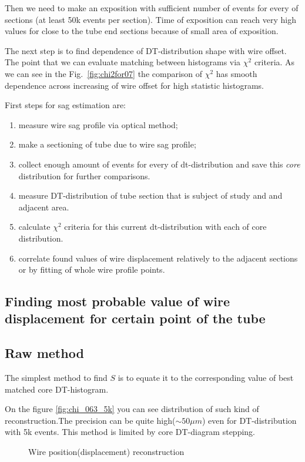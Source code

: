 	Then we need to make an exposition with sufficient number of events for every of sections (at least 50k events per section). Time of exposition can reach very high values for close to the tube end sections because of small area of exposition.
	
	The next step is to find dependence of DT-distribution shape with wire offset. The point that we can evaluate matching between histograms via $\chi^2$  criteria. As we can see in the Fig.~\ref{fig:chi2for07} the comparison of  $\chi^2$ has smooth dependence across increasing of wire offset for high statistic histograms.
		
	First steps for sag estimation are:
	\begin{enumerate}
	\item measure wire sag profile via optical method;	
	\item make a sectioning of tube due to wire sag profile;
	\item collect enough amount of events for every of dt-distribution and save this {\it core} distribution for further comparisons.
	\item measure DT-distribution of tube section that is subject of study and and adjacent area.
	\item calculate $\chi^2$ criteria for this current dt-distribution with each of core distribution.
	\item correlate found values of wire displacement relatively to the adjacent sections or by fitting of whole wire profile points.
	\end{enumerate}

	\subsection{Finding most probable value of wire displacement for certain point of the tube}
	
	\subsection{Raw method}
	The simplest method to find $S$ is to equate it to the corresponding value of best matched core DT-histogram.
	
	On the figure \ref{fig:chi_063_5k}  you can see distribution of such kind of reconstruction.The precision can be quite high($\sim 50 \mu m$) even for DT-distribution with 5k events. This method is limited by core DT-diagram stepping.
	
	\begin{figure}[h!]
		\centering
		\qquad
		\caption{Wire position(displacement) reconstruction}			
	\end{figure}	
	
